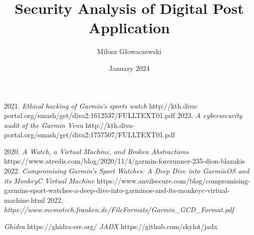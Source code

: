 \documentclass{article}
\title{Security Analysis of Digital Post Application}
\author{Miłosz Głowaczewski}
\date{January 2024}
\begin{document}
    \maketitle
    \pagebreak
    \tableofcontents

    
    
    
    
    
    
    
    

    \begin{thebibliography}{99}
         2021. \textit{Ethical hacking of Garmin’s sports watch} http://kth.diva-portal.org/smash/get/diva2:1612537/FULLTEXT01.pdf
         2023. \textit{A cybersecurity audit of the Garmin Venu} http://kth.diva-portal.org/smash/get/diva2:1757507/FULLTEXT01.pdf

         2020. \textit{A Watch, a Virtual Machine, and Broken Abstractions} https://www.atredis.com/blog/2020/11/4/garmin-forerunner-235-dion-blazakis
         2022. \textit{Compromising Garmin’s Sport Watches: A Deep Dive into GarminOS and its MonkeyC Virtual Machine} https://www.anvilsecure.com/blog/compromising-garmins-sport-watches-a-deep-dive-into-garminos-and-its-monkeyc-virtual-machine.html
         2022. \textit{https://www.memotech.franken.de/FileFormats/Garmin\_GCD\_Format.pdf}

         \textit{Ghidra} https://ghidra-sre.org/
         \textit{JADX} https://github.com/skylot/jadx
    \end{thebibliography}
\end{document}
